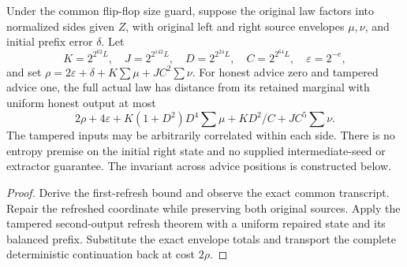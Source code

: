 \begin{theorem}
  \label{thm:lowerbounds-algebraic-opposite-flipflop-false}
  \leanok
  Under the common flip-flop size guard, suppose the original law factors
  into normalized sides given $Z$, with original left and right source
  envelopes $\mu,\nu$, and initial prefix error $\delta$. Let
  \[
    K=2^{2^{62}L},\quad J=2^{2^{142}L},\quad
    D=2^{2^{24}L},\quad C=2^{2^{64}L},\quad \varepsilon=2^{-e},
  \]
  and set $\rho=2\varepsilon+\delta+K\sum\mu+JC^2\sum\nu$.
  For honest advice zero and tampered advice one, the full actual law has
  distance from its retained marginal with uniform honest output at most
  \[
    2\rho+4\varepsilon+K(1+D^2)D^4\sum\mu+KD^2/C+JC^5\sum\nu.
  \]
  The tampered inputs may be arbitrarily correlated within each side.
  There is no entropy premise on the initial right state and no supplied
  intermediate-seed or extractor guarantee. The invariant across advice
  positions is constructed below.
\end{theorem}
\begin{proof}
  \leanok
  Derive the first-refresh bound and observe the exact common transcript.
  Repair the refreshed coordinate while preserving both original sources.
  Apply the tampered second-output refresh theorem with a uniform repaired
  state and its balanced prefix. Substitute the exact envelope totals and
  transport the complete deterministic continuation back at cost $2\rho$.
\end{proof}

